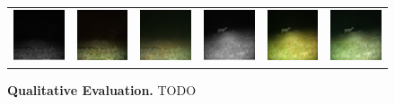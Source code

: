 \begin{figure}[htp!]
\begin{tabularx}{\textwidth}{>{\centering\arraybackslash}X >{\centering\arraybackslash}X >{\centering\arraybackslash}X >{\centering\arraybackslash}X >{\centering\arraybackslash}X >{\centering\arraybackslash}X}
        \includegraphics{gfx/diffusion-sampling-full-vs-high-pass-filter-qual/nir_S2_B06_R3_PICT3848.jpg} & \includegraphics{gfx/diffusion-sampling-full-vs-high-pass-filter-qual/full-pass_S2_B06_R3_PICT3848.png} & \includegraphics{gfx/diffusion-sampling-full-vs-high-pass-filter-qual/high-pass_S2_B06_R3_PICT3848.png} & \includegraphics{gfx/diffusion-sampling-full-vs-high-pass-filter-qual/nir_S2_B07_R1_PICT3274.jpg} & \includegraphics{gfx/diffusion-sampling-full-vs-high-pass-filter-qual/full-pass_S2_B07_R1_PICT3274.png} & \includegraphics{gfx/diffusion-sampling-full-vs-high-pass-filter-qual/high-pass_S2_B07_R1_PICT3274.png}
    \end{tabularx}
    \caption{
        \textbf{Qualitative Evaluation.} TODO
    }
    \label{fig:qualitative-evaluation-full-high-pass}
\end{figure}

